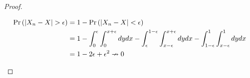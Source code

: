 \documentclass[12pt, letterpaper]{paper}
\begin{document}
\begin{question}
\begin{proof}
\begin{enumerate}
      \begin{align*}
        \Pr \left(  \left \lvert  X_n - X \right \rvert > \epsilon \right )  &= 1 - \Pr \left(  \left \lvert  X_n - X  \right \rvert < \epsilon \right )\\
        &= 1 - \int_0^{\epsilon} \int_0^{x+\epsilon} dydx - \int_{\epsilon}^{1-\epsilon}\int_{x - \epsilon}^{x + \epsilon}dydx -
          \int_{1-\epsilon}^{1}\int_{x-\epsilon}^1dydx\\
        &= 1 - 2\epsilon + \epsilon^2 \nrightarrow 0 
      \end{align*}

    \end{enumerate}

  \end{proof}

\end{question}
\end{document}
